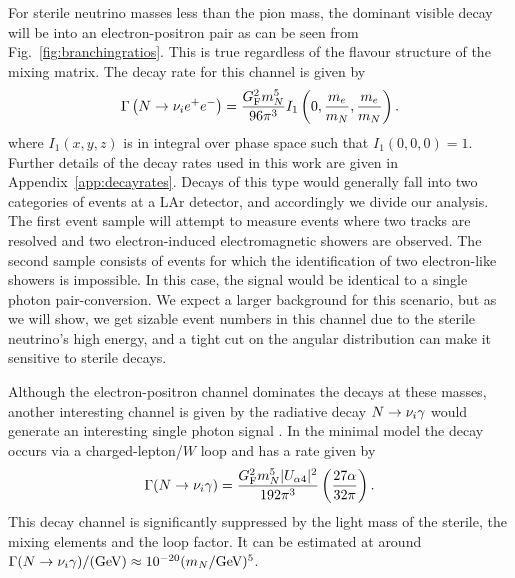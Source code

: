 \documentclass[11pt, a4paper]{article}
\newcommand{\reffig}[1]{Fig.~\ref{#1}}
\newcommand{\refapp}[1]{Appendix~\ref{#1}}
\def\ster{\ensuremath N}
\begin{document}
For sterile neutrino masses less than the pion mass, the dominant visible decay
will be into an electron-positron pair as can be seen from
\reffig{fig:branchingratios}. This is true regardless of the flavour structure
of the mixing matrix. The decay rate for this channel is given by 
%
\[ \Gamma\left(\ster\to \nu_i e^+e^-\right) =
\frac{G_\text{F}^2m_\ster^5}{96\pi^3}I_1\left(0,\frac{m_e}{m_\ster},\frac{
m_e}{m_\ster}\right).  \]
%
where $I_1(x,y,z)$ is in integral over phase space such that $I_1(0,0,0) = 1$.
Further details of the decay rates used in this work are given in
\refapp{app:decayrates}.
%
Decays of this type would generally fall into two categories of events at a LAr
detector, and accordingly we divide our analysis. The first event sample will
attempt to measure events where two tracks are resolved and two
electron-induced electromagnetic showers are observed.
%
The second sample consists of events for which the identification of two
electron-like showers is impossible. In this case, the signal would be identical
to a single photon pair-conversion. We expect a larger background for this
scenario, but as we will show, we get sizable event numbers in this channel due
to the sterile neutrino's high energy, and a tight cut on the angular
distribution can make it sensitive to sterile decays.

Although the electron-positron channel dominates the decays at these masses,
another interesting channel is given by the radiative decay
$\ster\to\nu_i\gamma$ would generate an interesting single photon signal
\cite{PhysRevD.25.766}. In the minimal model the decay occurs via a
charged-lepton/$W$ loop and has a rate given by
%
\[ \Gamma(\ster\to\nu_i\gamma) = \frac{G_\text{F}^2m_\ster^5 |U_{\alpha
4}|^2}{192 \pi^3} \left( \frac{27 \alpha}{32 \pi} \right). \]
%
This decay channel is significantly suppressed by the light mass of the
sterile, the mixing elements and the loop factor. It can be estimated at
around $\Gamma(\ster\to\nu_i\gamma)/(\text{GeV}) \approx 10^{-20}
(m_\ster/\text{GeV})^5$.  
\end{document}
